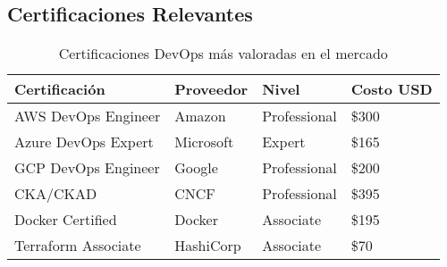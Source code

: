 \documentclass[12pt,a4paper]{article}
\begin{document}
\subsection{Certificaciones Relevantes}
\begin{table}[h!]
\centering
\begin{tabular}{|l|l|l|l|}
\hline
\textbf{Certificación} & \textbf{Proveedor} & \textbf{Nivel} & \textbf{Costo USD} \\
\hline
AWS DevOps Engineer & Amazon & Professional & \$300 \\
\hline
Azure DevOps Expert & Microsoft & Expert & \$165 \\
\hline
GCP DevOps Engineer & Google & Professional & \$200 \\
\hline
CKA/CKAD & CNCF & Professional & \$395 \\
\hline
Docker Certified & Docker & Associate & \$195 \\
\hline
Terraform Associate & HashiCorp & Associate & \$70 \\
\hline
\end{tabular}
\caption{Certificaciones DevOps más valoradas en el mercado}
\end{table}
\end{document}
